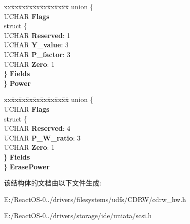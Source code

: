 \begin{DoxyCompactItemize}
\begin{tabbing}
\end{tabbing}\item 
\mbox{\label{struct___r_e_a_d___t_o_c___a_t_i_p_a08a20379bfb013f477266a18fc85246e}} 
\begin{tabbing}
xx\=xx\=xx\=xx\=xx\=xx\=xx\=xx\=xx\=\kill
union \{\\
\>UCHAR {\bfseries Flags}\\
\>struct \{\\
\>\>UCHAR {\bfseries Reserved}: 1\\
\>\>UCHAR {\bfseries Y\_value}: 3\\
\>\>UCHAR {\bfseries P\_factor}: 3\\
\>\>UCHAR {\bfseries Zero}: 1\\
\>\} {\bfseries Fields}\\
\} {\bfseries Power}\\

\end{tabbing}\item 
\mbox{\label{struct___r_e_a_d___t_o_c___a_t_i_p_a1764d21deb842ba8c155eed35df97173}} 
\begin{tabbing}
xx\=xx\=xx\=xx\=xx\=xx\=xx\=xx\=xx\=\kill
union \{\\
\>UCHAR {\bfseries Flags}\\
\>struct \{\\
\>\>UCHAR {\bfseries Reserved}: 4\\
\>\>UCHAR {\bfseries P\_W\_ratio}: 3\\
\>\>UCHAR {\bfseries Zero}: 1\\
\>\} {\bfseries Fields}\\
\} {\bfseries ErasePower}\\

\end{tabbing}\end{DoxyCompactItemize}


该结构体的文档由以下文件生成\+:\begin{DoxyCompactItemize}
\item 
E\+:/\+React\+O\+S-\/0../drivers/filesystems/udfs/\+C\+D\+R\+W/cdrw\+\_\+hw.\+h\item 
E\+:/\+React\+O\+S-\/0../drivers/storage/ide/uniata/scsi.\+h\end{DoxyCompactItemize}
